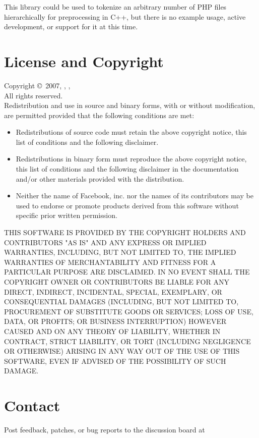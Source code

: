 \documentclass[11pt,titlepage]{article}
\begin{document}
This library could be used to tokenize an arbitrary number of PHP files hierarchically for preprocessing in C++, but there is no example usage, active development, or support for it at this time.


\newpage
\section{License and Copyright}

Copyright \copyright\ 2007, , , 
\\
All rights reserved.
\\

Redistribution and use in source and binary forms, with or without modification, are permitted provided that the following conditions are met:

\begin{itemize}

\item Redistributions of source code must retain the above copyright notice, this list of conditions and the following disclaimer.
\item Redistributions in binary form must reproduce the above copyright notice, this list of conditions and the following disclaimer in the documentation and/or other materials provided with the distribution.
\item Neither the name of Facebook, inc. nor the names of its contributors may be used to endorse or promote products derived from this software without specific prior written permission.

\end{itemize}

THIS SOFTWARE IS PROVIDED BY THE COPYRIGHT HOLDERS AND CONTRIBUTORS "AS IS" AND ANY EXPRESS OR IMPLIED WARRANTIES, INCLUDING, BUT NOT LIMITED TO, THE IMPLIED WARRANTIES OF MERCHANTABILITY AND FITNESS FOR A PARTICULAR PURPOSE ARE DISCLAIMED. IN NO EVENT SHALL THE COPYRIGHT OWNER OR CONTRIBUTORS BE LIABLE FOR ANY DIRECT, INDIRECT, INCIDENTAL, SPECIAL, EXEMPLARY, OR CONSEQUENTIAL DAMAGES (INCLUDING, BUT NOT LIMITED TO, PROCUREMENT OF SUBSTITUTE GOODS OR SERVICES; LOSS OF USE, DATA, OR PROFITS; OR BUSINESS INTERRUPTION) HOWEVER CAUSED AND ON ANY THEORY OF LIABILITY, WHETHER IN CONTRACT, STRICT LIABILITY, OR TORT (INCLUDING NEGLIGENCE OR OTHERWISE) ARISING IN ANY WAY OUT OF THE USE OF THIS SOFTWARE, EVEN IF ADVISED OF THE POSSIBILITY OF SUCH DAMAGE.

\section{Contact}

Post feedback, patches, or bug reports to the discussion board at \\
\end{document}
